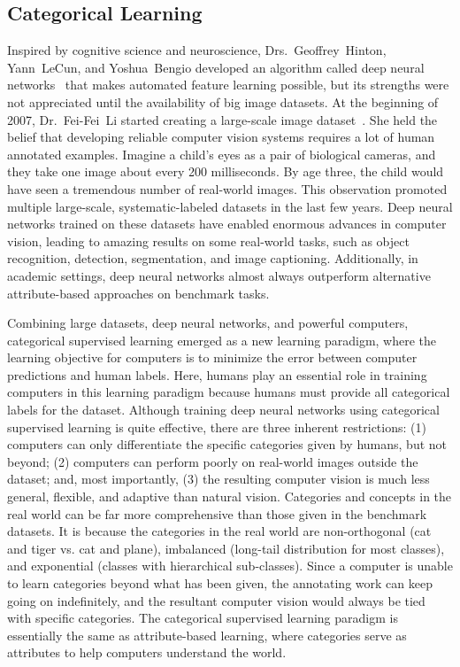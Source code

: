 \subsection{Categorical Learning}

Inspired by cognitive science and neuroscience, Drs.~Geoffrey~Hinton, Yann~LeCun, and Yoshua~Bengio developed an algorithm called deep neural networks~\citep{lecun1989backpropagation,bengio2009learning} that makes automated feature learning possible, but its strengths were not appreciated until the availability of big image datasets. At the beginning of 2007, Dr.~Fei-Fei~Li started creating a large-scale image dataset~\citep{deng2009imagenet}. She held the belief that developing reliable computer vision systems requires a lot of human annotated examples. Imagine a child's eyes as a pair of biological cameras, and they take one image about every 200 milliseconds. By age three, the child would have seen a tremendous number of real-world images. This observation promoted multiple large-scale, systematic-labeled datasets in the last few years. Deep neural networks trained on these datasets have enabled enormous advances in computer vision, leading to amazing results on some real-world tasks, such as object recognition, detection, segmentation, and image captioning. Additionally, in academic settings, deep neural networks almost always outperform alternative attribute-based approaches on benchmark tasks.

Combining large datasets, deep neural networks, and powerful computers, categorical supervised learning emerged as a new learning paradigm, where the learning objective for computers is to minimize the error between computer predictions and human labels. Here, humans play an essential role in training computers in this learning paradigm because humans must provide all categorical labels for the dataset. Although training deep neural networks using categorical supervised learning is quite effective, there are three inherent restrictions: (1) computers can only differentiate the specific categories given by humans, but not beyond; (2) computers can perform poorly on real-world images outside the dataset; and, most importantly, (3) the resulting computer vision is much less general, flexible, and adaptive than natural vision. Categories and concepts in the real world can be far more comprehensive than those given in the benchmark datasets. It is because the categories in the real world are non-orthogonal (cat and tiger vs. cat and plane), imbalanced (long-tail distribution for most classes), and exponential (classes with hierarchical sub-classes). Since a computer is unable to learn categories beyond what has been given, the annotating work can keep going on indefinitely, and the resultant computer vision would always be tied with specific categories. The categorical supervised learning paradigm is essentially the same as attribute-based learning, where categories serve as attributes to help computers understand the world. 


